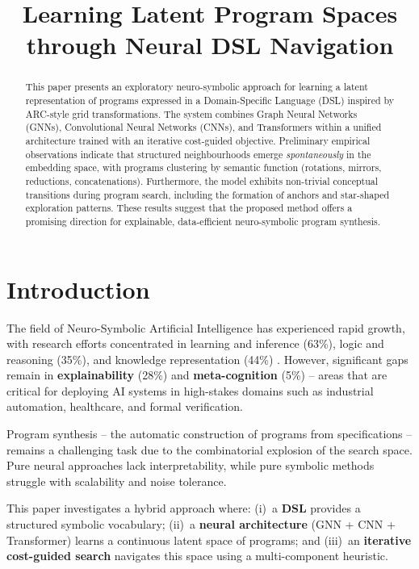 \documentclass[final]{nesy2027}
\title[Neural DSL Navigation]{Learning Latent Program Spaces through Neural DSL Navigation%
  \titletag{\thanks{Code available at https://github.com/Julien-Livet/aicpp}}}
\begin{document}
\maketitle

\begin{abstract}
This paper presents an exploratory neuro-symbolic approach for learning a
latent representation of programs expressed in a Domain-Specific Language (DSL)
inspired by ARC-style grid transformations.
The system combines Graph Neural Networks (GNNs), Convolutional Neural Networks
(CNNs), and Transformers within a unified architecture trained with an iterative
cost-guided objective.
Preliminary empirical observations indicate that structured neighbourhoods emerge
\emph{spontaneously} in the embedding space, with programs clustering by
semantic function (rotations, mirrors, reductions, concatenations).
Furthermore, the model exhibits non-trivial conceptual transitions during program
search, including the formation of anchors and star-shaped exploration patterns.
These results suggest that the proposed method offers a promising direction for
explainable, data-efficient neuro-symbolic program synthesis.
\end{abstract}

\section{Introduction}
\label{sec:intro}

The field of Neuro-Symbolic Artificial Intelligence has experienced rapid
growth, with research efforts concentrated in learning and inference (63\%),
logic and reasoning (35\%), and knowledge representation (44\%)
\citep{colelough2025neurosymbolic}.
However, significant gaps remain in \textbf{explainability} (28\%) and
\textbf{meta-cognition} (5\%) -- areas that are critical for deploying AI
systems in high-stakes domains such as industrial automation, healthcare, and
formal verification.

Program synthesis -- the automatic construction of programs from specifications
-- remains a challenging task due to the combinatorial explosion of the search
space.
Pure neural approaches lack interpretability, while pure symbolic methods
struggle with scalability and noise tolerance.

This paper investigates a hybrid approach where: (i)~a \textbf{DSL} provides a
structured symbolic vocabulary; (ii)~a \textbf{neural architecture}
(GNN + CNN + Transformer) learns a continuous latent space of programs;
and (iii)~an \textbf{iterative cost-guided search} navigates this space using a
multi-component heuristic.
\end{document}
